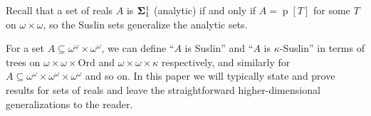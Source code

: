 \documentclass[fleqn, 11pt]{amsart}
\theoremstyle{plain}
\theoremstyle{definition}
\theoremstyle{remark}
\newcommand{\Ord}{\mathrm{Ord}}
\DeclareMathOperator{\p}{p}
\begin{document}
Recall that a set of reals $A$ is ${\bf \Sigma}^1_1$ (analytic) if and only if $A = \p[T]$ for some $T$ on $\omega \times \omega$, so the Suslin sets generalize the analytic sets.




For a set $A \subseteq \omega^\omega \times \omega^\omega$, we can define ``$A$ is Suslin'' and ``$A$ is $\kappa$-Suslin'' in terms of trees on $\omega \times \omega \times \Ord$ and $\omega \times \omega \times \kappa$ respectively, and similarly for 
$A \subseteq \omega^\omega \times \omega^\omega \times \omega^\omega$ and so on.
In this paper we will typically state and prove results for sets of reals and leave the straightforward higher-dimensional generalizations to the reader.









% 
% 
\end{document}
